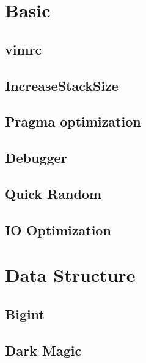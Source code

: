 \documentclass[a4paper,10pt,twocolumn,oneside]{article}
\begin{document}
\pagestyle{fancy}
\fancyfoot{}
\fancyhead[R]{\thepage}
\renewcommand{\headrulewidth}{0.4pt}
\renewcommand{\contentsname}{Contents} 

\scriptsize
\tableofcontents

\newpage

\section{Basic}
\subsection{vimrc}

\subsection{IncreaseStackSize}

\subsection{Pragma optimization}

\subsection{Debugger}

\subsection{Quick Random}

\subsection{IO Optimization}


\section{Data Structure}
\subsection{Bigint}

\subsection{Dark Magic}

\end{document}
